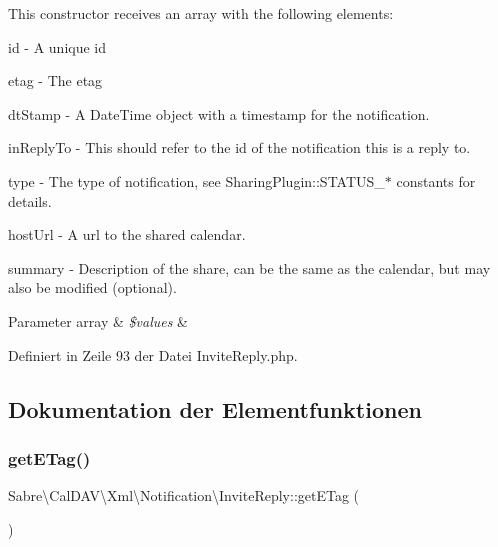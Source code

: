 This constructor receives an array with the following elements\+:


\begin{DoxyItemize}
\item id -\/ A unique id
\item etag -\/ The etag
\item dt\+Stamp -\/ A Date\+Time object with a timestamp for the notification.
\item in\+Reply\+To -\/ This should refer to the \textquotesingle{}id\textquotesingle{} of the notification this is a reply to.
\item type -\/ The type of notification, see Sharing\+Plugin\+::\+S\+T\+A\+T\+U\+S\+\_\+$\ast$ constants for details.
\item host\+Url -\/ A url to the shared calendar.
\item summary -\/ Description of the share, can be the same as the calendar, but may also be modified (optional).
\end{DoxyItemize}


\begin{DoxyParams}[1]{Parameter}
array & {\em \$values} & \\
\hline
\end{DoxyParams}


Definiert in Zeile 93 der Datei Invite\+Reply.\+php.



\subsection{Dokumentation der Elementfunktionen}
\mbox{\label{class_sabre_1_1_cal_d_a_v_1_1_xml_1_1_notification_1_1_invite_reply_a54973289592e7bc7ec95cc889e19d3e8}} 
\subsubsection{\texorpdfstring{get\+E\+Tag()}{getETag()}}
{\footnotesize\ttfamily Sabre\textbackslash{}\+Cal\+D\+A\+V\textbackslash{}\+Xml\textbackslash{}\+Notification\textbackslash{}\+Invite\+Reply\+::get\+E\+Tag (\begin{DoxyParamCaption}{ }\end{DoxyParamCaption})}

